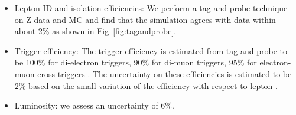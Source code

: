 \begin{itemize}
\begin{table}[hbt]
\begin{center}
\begin{tabular}{lcccc}
	  \hline
	\end{tabular}
  \end{center}
\end{table}

\item Lepton ID and isolation efficiencies: 
  We perform a tag-and-probe technique
  on Z data and MC and find that the simulation agrees with data within about 2\% as shown 
  in Fig~\ref{fig:tagandprobe}.

\item Trigger efficiency: 
  The trigger efficiency is estimated from tag and probe to be 
  100\% for di-electron triggers,
  90\% for di-muon triggers,
  95\% for electron-muon cross triggers \cite{ref:smurfww}. 
  The uncertainty on these efficiencies is estimated to be 2\% based on the small variation of the efficiency
  with respect to lepton \pt.

\item Luminosity: we assess an uncertainty of 6\%.

\end{itemize}


